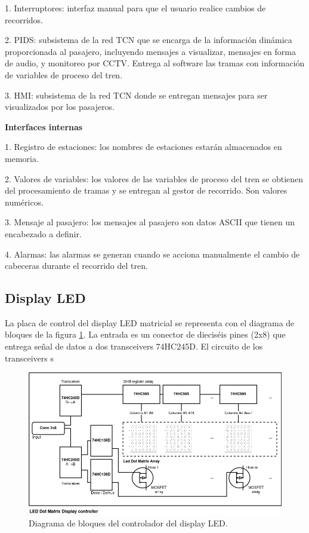 \documentclass[
11pt, %
]{charter}
\begin{document}
1. Interruptores: interfaz manual para que el usuario realice cambios de recorridos.

2. PIDS: subsistema de la red TCN que se encarga de la información dinámica proporcionada al pasajero, incluyendo mensajes a visualizar, mensajes en forma de audio, y monitoreo por CCTV. Entrega al software las tramas con información de variables de proceso del tren.

3. HMI: subsistema de la red TCN donde se entregan mensajes para ser visualizados por
los pasajeros.

\textbf{Interfaces internas}

1. Registro de estaciones: los nombres de estaciones estarán almacenados en memoria.

2. Valores de variables: los valores de las variables de proceso del tren se obtienen del procesamiento de tramas y se entregan al gestor de recorrido. Son valores numéricos.

3. Mensaje al pasajero: los mensajes al pasajero son datos ASCII que tienen un encabezado a definir.

4. Alarmas: las alarmas se generan cuando se acciona manualmente el cambio de cabeceras durante el recorrido del tren.
\pagebreak

\subsection{Display LED}
La placa de control del display LED matricial se representa con el diagrama de bloques de la figura \ref{fig:blockDiagram LED display}. La entrada es un conector de dieciséis pines (2x8) que entrega señal de datos a dos transceivers 74HC245D. El circuito de los transceivers s

\begin{figure}[htpb]
\centering 
\includegraphics[width=1\textwidth]{./Pics/blockDiagram.png}
\caption{Diagrama de bloques del controlador del display LED.}
\label{fig:blockDiagram LED display}
\end{figure}
\end{document}
